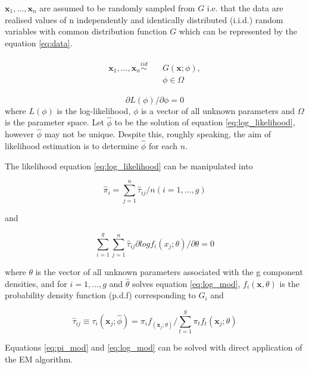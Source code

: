 \documentclass[a4paper]{article}
\begin{document}
$\textbf{x}_1,...,\textbf{x}_n$ are assumed to be randomly sampled from $G$ i.e. that the data are realised values of n independently and identically distributed (i.i.d.) random variables with common distribution function $G$ which can be represented by the equation \ref{eq:data}.

\begin{align}\label{eq:data}
\begin{split}
\textbf{x}_1, ... , \textbf{x}_n \displaystyle  \stackrel{iid}{\sim} \quad &G(\textbf{x}; \phi), \\
&\phi \in \Omega
\end{split}
\end{align}

\begin{equation}\label{eq:log_likelihood}
\partial L(\phi)/ \partial \phi = 0
\end{equation}
where $L(\phi)$ is the log-likelihood, $\phi$ is a vector of all unknown parameters and $\Omega$ is the parameter space. Let $\hat{\phi}$ to be the solution of equation \ref{eq:log_likelihood}, however $\hat{\phi}$ may not be unique. Despite this, roughly speaking, the aim of likelihood estimation is to determine $\hat{\phi}$ for each $n$. 

The likelihood equation \ref{eq:log_likelihood} can be manipulated into

\begin{equation}\label{eq:pi_mod}
\hat{\pi}_i = \sum_{j=1}^{n} \hat{\tau}_{ij} /n (i = 1, ... , g)
\end{equation}

and 

\begin{equation}\label{eq:log_mod}
\sum_{i=1}^g \sum_{j=1}^n \hat{\tau}_{ij} \partial log f_i(x_j;\theta) / \partial \theta = 0
\end{equation}

\noindent where $\theta$ is the vector of all unknown parameters associated with the g component densities, and for $i = 1, ... , g$ and $\hat{\theta}$ solves equation \ref{eq:log_mod}, $f_i(\textbf{x},\theta)$ is the probability density function (p.d.f) corresponding to $G_i$ and

$$\hat{\tau}_{ij} \equiv \tau_i(\textbf{x}_j;\hat{\phi}) = \pi_i f_(\textbf{x}_j;\theta) / \sum_{t=1}^g \pi_t f_t(\textbf{x}_j;\theta)$$

Equations \ref{eq:pi_mod} and \ref{eq:log_mod} can be solved with direct application of the EM algorithm.
\end{document}
